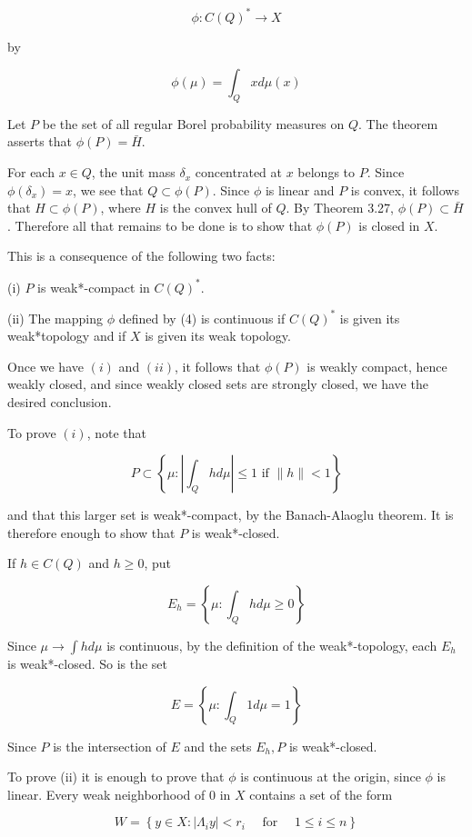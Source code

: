 \documentclass[10pt]{article}
\begin{document}
$$
\phi: C(Q)^{*} \rightarrow X
$$

by

$$
\phi(\mu)=\int_{Q} x d \mu(x)
$$

Let $P$ be the set of all regular Borel probability measures on $Q$. The theorem asserts that $\phi(P)=\bar{H}$.

For each $x \in Q$, the unit mass $\delta_{x}$ concentrated at $x$ belongs to $P$. Since $\phi\left(\delta_{x}\right)=x$, we see that $Q \subset \phi(P)$. Since $\phi$ is linear and $P$ is convex, it follows that $H \subset \phi(P)$, where $H$ is the convex hull of $Q$. By Theorem 3.27, $\phi(P) \subset \bar{H}$. Therefore all that remains to be done is to show that $\phi(P)$ is closed in $X$.

This is a consequence of the following two facts:

(i) $P$ is weak*-compact in $C(Q)^{*}$.

(ii) The mapping $\phi$ defined by (4) is continuous if $C(Q)^{*}$ is given its weak*topology and if $X$ is given its weak topology.

Once we have $(i)$ and $(i i)$, it follows that $\phi(P)$ is weakly compact, hence weakly closed, and since weakly closed sets are strongly closed, we have the desired conclusion.

To prove $(i)$, note that

$$
P \subset\left\{\mu:\left|\int_{Q} h d \mu\right| \leq 1 \text { if }\|h\|<1\right\}
$$

and that this larger set is weak*-compact, by the Banach-Alaoglu theorem. It is therefore enough to show that $P$ is weak*-closed.

If $h \in C(Q)$ and $h \geq 0$, put

$$
E_{h}=\left\{\mu: \int_{Q} h d \mu \geq 0\right\}
$$

Since $\mu \rightarrow \int h d \mu$ is continuous, by the definition of the weak*-topology, each $E_{h}$ is weak*-closed. So is the set

$$
E=\left\{\mu: \int_{Q} 1 d \mu=1\right\}
$$

Since $P$ is the intersection of $E$ and the sets $E_{h}, P$ is weak*-closed.

To prove (ii) it is enough to prove that $\phi$ is continuous at the origin, since $\phi$ is linear. Every weak neighborhood of 0 in $X$ contains a set of the form

$$
W=\left\{y \in X:\left|\Lambda_{i} y\right|<r_{i} \quad \text { for } \quad 1 \leq i \leq n\right\}
$$
\end{document}
